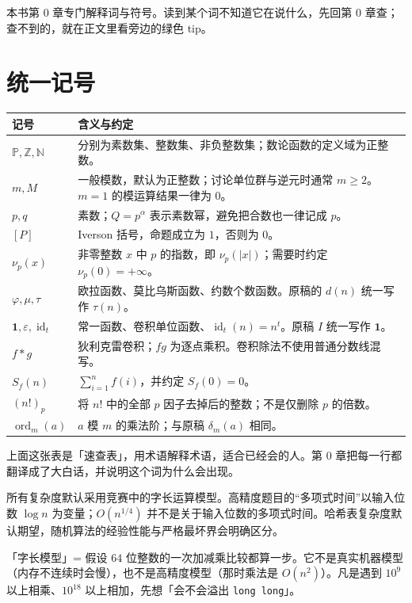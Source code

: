 \documentclass[UTF8,a4paper,11pt,twoside,openright,fontset=fandol]{ctexbook}
\theoremstyle{definition}
\newcommand{\Z}{\mathbb Z}
\newcommand{\N}{\mathbb N}
\newcommand{\Pp}{\mathbb P}
\newcommand{\eps}{\varepsilon}
\newcommand{\one}{\mathbf 1}
\newcommand{\id}{\operatorname{id}}
\newcommand{\ord}{\operatorname{ord}}
\newcommand{\iva}[1]{\left[#1\right]}
\begin{document}
\begin{tip}[导读：不认识的词去哪查]
本书第 0 章专门解释词与符号。读到某个词不知道它在说什么，先回第 0 章查；查不到的，就在正文里看旁边的绿色 tip。
\end{tip}


\section*{统一记号}
\begin{longtable}{p{}p{}}
\toprule
记号 & 含义与约定\\\midrule
$\Pp,\Z,\N$ & 分别为素数集、整数集、非负整数集；数论函数的定义域为正整数。\\
$m,M$ & 一般模数，默认为正整数；讨论单位群与逆元时通常 $m\ge2$。$m=1$ 的模运算结果一律为 $0$。\\
$p,q$ & 素数；$Q=p^\alpha$ 表示素数幂，避免把合数也一律记成 $p$。\\
$\iva{P}$ & Iverson 括号，命题成立为 $1$，否则为 $0$。\\
$\nu_p(x)$ & 非零整数 $x$ 中 $p$ 的指数，即 $\nu_p(|x|)$；需要时约定 $\nu_p(0)=+\infty$。\\
$\varphi,\mu,\tau$ & 欧拉函数、莫比乌斯函数、约数个数函数。原稿的 $d(n)$ 统一写作 $\tau(n)$。\\
$\one,\eps,\id_t$ & 常一函数、卷积单位函数、$\id_t(n)=n^t$。原稿 $I$ 统一写作 $\one$。\\
$f*g$ & 狄利克雷卷积；$fg$ 为逐点乘积。卷积除法不使用普通分数线混写。\\
$S_f(n)$ & $\sum_{i=1}^n f(i)$，并约定 $S_f(0)=0$。\\
$(n!)_p$ & 将 $n!$ 中的全部 $p$ 因子去掉后的整数；不是仅删除 $p$ 的倍数。\\
$\ord_m(a)$ & $a$ 模 $m$ 的乘法阶；与原稿 $\delta_m(a)$ 相同。\\
\bottomrule
\end{longtable}

\begin{tip}[说明：这张速查表怎么用]
上面这张表是「速查表」，用术语解释术语，适合已经会的人。第 0 章把每一行都翻译成了大白话，并说明这个词为什么会出现。
\end{tip}


所有复杂度默认采用竞赛中的字长运算模型。高精度题目的“多项式时间”以输入位数 $\log n$ 为变量；$O(n^{1/4})$ 并不是关于输入位数的多项式时间。哈希表复杂度默认期望，随机算法的经验性能与严格最坏界会明确区分。

\begin{tip}[词义：字长模型]
「字长模型」= 假设 $64$ 位整数的一次加减乘比较都算一步。它不是真实机器模型（内存不连续时会慢），也不是高精度模型（那时乘法是 $O(n^2)$）。凡是遇到 $10^9$ 以上相乘、$10^{18}$ 以上相加，先想「会不会溢出 \texttt{long long}」。
\end{tip}
\end{document}
